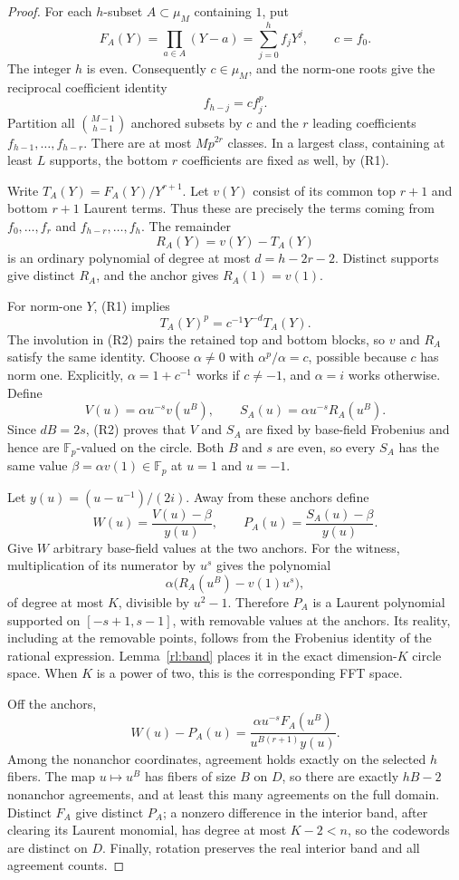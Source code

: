 \documentclass[11pt,letterpaper]{article}
\theoremstyle{definition}
\theoremstyle{remark}
\begin{document}
\begin{proof}
For each $h$-subset $A\subset\mu_M$ containing $1$, put
\[
 F_A(Y)=\prod_{a\in A}(Y-a)=\sum_{j=0}^{h} f_jY^j,\qquad c=f_0.
\]
The integer $h$ is even. Consequently $c\in\mu_M$, and the norm-one roots give
the reciprocal coefficient identity
\[
 f_{h-j}=c f_j^p.                                      \tag{R1}
\]
Partition all $\binom{M-1}{h-1}$ anchored subsets by $c$ and the $r$ leading
coefficients $f_{h-1},\ldots,f_{h-r}$. There are at most $M p^{2r}$ classes.
In a largest class, containing at least $L$ supports, the bottom $r$
coefficients are fixed as well, by (R1).

Write $T_A(Y)=F_A(Y)/Y^{r+1}$. Let $v(Y)$ consist of its common top $r+1$
and bottom $r+1$ Laurent terms. Thus these are precisely the terms coming from
$f_0,\ldots,f_r$ and $f_{h-r},\ldots,f_h$. The remainder
\[
 R_A(Y)=v(Y)-T_A(Y)
\]
is an ordinary polynomial of degree at most $d=h-2r-2$. Distinct supports give
distinct $R_A$, and the anchor gives $R_A(1)=v(1)$.

For norm-one $Y$, (R1) implies
\[
 T_A(Y)^p=c^{-1}Y^{-d}T_A(Y).                           \tag{R2}
\]
The involution in (R2) pairs the retained top and bottom blocks, so $v$ and
$R_A$ satisfy the same identity. Choose $\alpha\ne0$ with
$\alpha^p/\alpha=c$, possible because $c$ has norm one. Explicitly,
$\alpha=1+c^{-1}$ works if $c\ne-1$, and $\alpha=i$ works otherwise. Define
\[
 V(u)=\alpha u^{-s}v(u^B),\qquad
 S_A(u)=\alpha u^{-s}R_A(u^B).
\]
Since $dB=2s$, (R2) proves that $V$ and $S_A$ are fixed by base-field
Frobenius and hence are $\mathbb F_p$-valued on the circle. Both $B$ and $s$
are even, so every $S_A$ has the same value
$\beta=\alpha v(1)\in\mathbb F_p$ at $u=1$ and $u=-1$.

Let $y(u)=(u-u^{-1})/(2i)$. Away from these anchors define
\[
 W(u)=\frac{V(u)-\beta}{y(u)},\qquad
 P_A(u)=\frac{S_A(u)-\beta}{y(u)}.
\]
Give $W$ arbitrary base-field values at the two anchors. For the witness,
multiplication of its numerator by $u^s$ gives the polynomial
\[
 \alpha\bigl(R_A(u^B)-v(1)u^s\bigr),
\]
of degree at most $K$, divisible by $u^2-1$. Therefore $P_A$ is a Laurent
polynomial supported on $[-s+1,s-1]$, with removable values at the anchors.
Its reality, including at the removable points, follows from the Frobenius
identity of the rational expression. Lemma~\ref{rl:band} places it in the
exact dimension-$K$ circle space. When $K$ is a power of two, this is
the corresponding FFT space.

Off the anchors,
\[
 W(u)-P_A(u)=
 \frac{\alpha u^{-s}F_A(u^B)}{u^{B(r+1)}y(u)}.
\]
Among the nonanchor coordinates, agreement holds exactly on the selected
$h$ fibers. The map $u\mapsto u^B$ has fibers of size $B$ on $D$, so
there are exactly $hB-2$ nonanchor agreements, and at least this many
agreements on the full domain. Distinct $F_A$ give distinct $P_A$;
a nonzero difference in the interior band, after clearing its Laurent
monomial, has degree at most $K-2<n$, so the codewords are distinct on $D$.
Finally, rotation preserves the real interior band and all agreement counts.
\end{proof}
\end{document}
